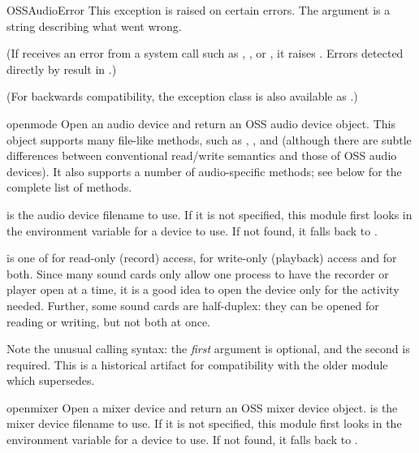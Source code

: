\begin{excdesc}{OSSAudioError}
This exception is raised on certain errors.  The argument is a string
describing what went wrong.

(If  receives an error from a system call such as
, , or , it
raises .  Errors detected directly by
 result in .)

(For backwards compatibility, the exception class is also available as
.)
\end{excdesc}

\begin{funcdesc}{open}{mode}
Open an audio device and return an OSS audio device object.  This
object supports many file-like methods, such as ,
, and  (although there are subtle
differences between conventional \UNIX{} read/write semantics and those of
OSS audio devices).  It also supports a number of audio-specific
methods; see below for the complete list of methods.

 is the audio device filename to use.  If it is not
specified, this module first looks in the environment variable
 for a device to use.  If not found, it falls back to
.

 is one of  for read-only (record) access,
 for write-only (playback) access and  for both.
Since many sound cards only allow one process to have the recorder or
player open at a time, it is a good idea to open the device only for the
activity needed.  Further, some sound cards are half-duplex: they can be
opened for reading or writing, but not both at once.

Note the unusual calling syntax: the \emph{first} argument is optional,
and the second is required.  This is a historical artifact for
compatibility with the older  module which
 supersedes.  %
\end{funcdesc}

\begin{funcdesc}{openmixer}{}
Open a mixer device and return an OSS mixer device object.  
 is the mixer device filename to use.  If it is
not specified, this module first looks in the environment variable
 for a device to use.  If not found, it falls back to
.

\end{funcdesc}


